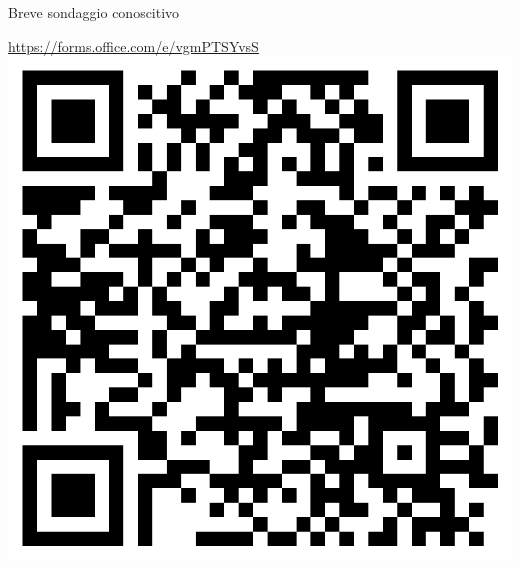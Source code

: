 \begin{frame}{Breve sondaggio conoscitivo}
  \begin{center}
    \vfill
    \url{https://forms.office.com/e/vgmPTSYvsS}
    \vfill
    \includegraphics[height=.6\textheight]{images/sondaggio-qr.png}
    \vfill
  \end{center}
\end{frame}

